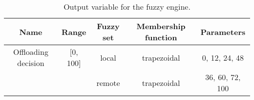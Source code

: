 \begin{table}
	\centering
	\begin{tabular}{|c|c|c|c|c|}
		\hline
		Name                & Range    & Fuzzy set & Membership function & Parameters      \\
		\hline
		Offloading decision & [0, 100] & local     & trapezoidal         & 0, 12, 24, 48   \\
		                    &          & remote    & trapezoidal         & 36, 60, 72, 100 \\
		\hline
	\end{tabular}
	\caption{Output variable for the fuzzy engine.}
	\label{tab:fuzzy-output}
\end{table}